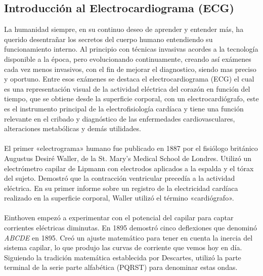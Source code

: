 \documentclass[12pt,letterpaper,oneside,openright]{book}
\begin{document}
\subsection{Introducción al Electrocardiograma (ECG)}
	La humanidad siempre, en su continuo deseo de aprender y entender más, ha querido desentrañar los secretos del cuerpo humano entendiendo su funcionamiento interno. Al principio con técnicas invasivas acordes a la tecnología disponible a la época, pero evolucionando continuamente, creando así exámenes cada vez menos invasivos, con el fin de mejorar el diagnostico, siendo mas preciso y oportuno. Entre esos exámenes se destaca el electrocardiograma (ECG) el cual es una representación visual de la actividad eléctrica del corazón en función del tiempo, que se obtiene desde la superficie corporal, con un electrocardiógrafo, este es el instrumento principal de la electrofisiología cardíaca y tiene una función relevante en el cribado y diagnóstico de las enfermedades cardiovasculares, alteraciones metabólicas y demás utilidades. \\
	\\
    El primer «electrograma» humano fue publicado en 1887 por el fisiólogo británico Augustus Desiré Waller, de la St. Mary's Medical School de Londres. Utilizó un electrómetro capilar de Lipmann con electrodos aplicados a la espalda y el tórax del sujeto. Demostró que la contracción ventricular precedía a la actividad eléctrica. En su primer informe sobre un registro de la electricidad cardíaca realizado en la superficie corporal, Waller utilizó el término «cardiógrafo».  \\
    \\
    Einthoven empezó a experimentar con el potencial del capilar para captar corrientes eléctricas diminutas. En 1895 demostró cinco deflexiones que denominó \textit{ABCDE} en 1895. Creó un ajuste matemático para tener en cuenta la inercia del sistema capilar, lo que produjo las curvas de corriente que vemos hoy en día. Siguiendo la tradición matemática establecida por Descartes, utilizó la parte terminal de la serie parte alfabética (PQRST) para denominar estas ondas. \\
    \\
\end{document}
